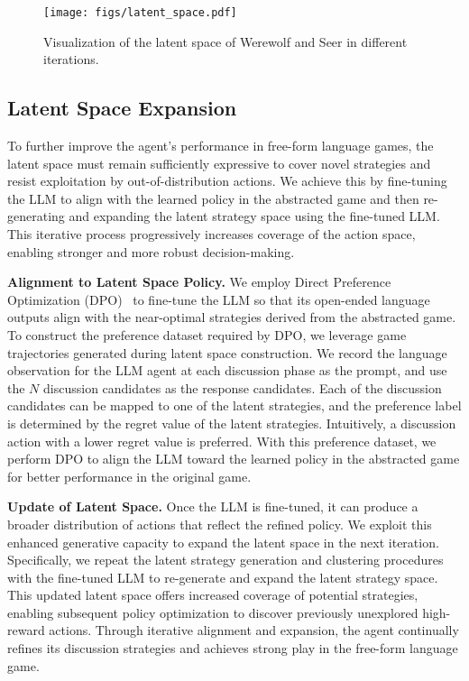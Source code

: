 \begin{figure*}[t]
    \centering
    \texttt{[image: figs/latent\_space.pdf]}
    \caption{Visualization of the latent space of Werewolf and Seer in different iterations.}
    \label{fig:latent_space}
\end{figure*}

\subsection{Latent Space Expansion}
To further improve the agent’s performance in free-form language games, the latent space must remain sufficiently expressive to cover novel strategies and resist exploitation by out-of-distribution actions. We achieve this by fine-tuning the LLM to align with the learned policy in the abstracted game and then re-generating and expanding the latent strategy space using the fine-tuned LLM. This iterative process progressively increases coverage of the action space, enabling stronger and more robust decision-making.

\textbf{Alignment to Latent Space Policy.}
We employ Direct Preference Optimization (DPO)~\cite{rafailov2024direct} to fine-tune the LLM so that its open-ended language outputs align with the near-optimal strategies derived from the abstracted game. To construct the preference dataset required by DPO, we leverage game trajectories generated during latent space construction. We record the language observation for the LLM agent at each discussion phase as the prompt, and use the $N$ discussion candidates as the response candidates. Each of the discussion candidates can be mapped to one of the latent strategies, and the preference label is determined by the regret value of the latent strategies. Intuitively, a discussion action with a lower regret value is preferred. With this preference dataset, we perform DPO to align the LLM toward the learned policy in the abstracted game for better performance in the original game.

\textbf{Update of Latent Space.}
Once the LLM is fine-tuned, it can produce a broader distribution of actions that reflect the refined policy. We exploit this enhanced generative capacity to expand the latent space in the next iteration. Specifically, we repeat the latent strategy generation and clustering procedures with the fine-tuned LLM to re-generate and expand the latent strategy space. This updated latent space offers increased coverage of potential strategies, enabling subsequent policy optimization to discover previously unexplored high-reward actions. Through iterative alignment and expansion, the agent continually refines its discussion strategies and achieves strong play in the free-form language game. 


